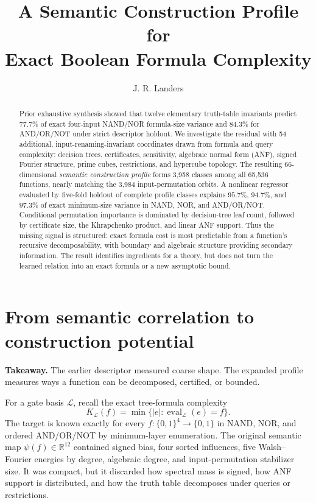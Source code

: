 \documentclass[10pt]{article}
\title{\vspace{-1.7em}\textbf{A Semantic Construction Profile for}\\[-1pt]
\textbf{Exact Boolean Formula Complexity}}
\author{J. R. Landers}
\date{\vspace{-1.4em}}
\theoremstyle{definition}
\begin{document}
\maketitle
\vspace{-1.6em}

\begin{abstract}
Prior exhaustive synthesis showed that twelve elementary truth-table invariants
predict $77.7\%$ of exact four-input NAND/NOR formula-size variance and $84.3\%$
for AND/OR/NOT under strict descriptor holdout.  We investigate the residual
with 54 additional, input-renaming-invariant coordinates drawn from formula
and query complexity: decision trees, certificates, sensitivity, algebraic
normal form (ANF), signed Fourier structure, prime cubes, restrictions, and
hypercube topology.  The resulting 66-dimensional \emph{semantic construction
profile} forms 3,958 classes among all 65,536 functions, nearly matching the
3,984 input-permutation orbits.  A nonlinear regressor evaluated by five-fold
holdout of complete profile classes explains $95.7\%$, $94.7\%$, and $97.3\%$
of exact minimum-size variance in NAND, NOR, and AND/OR/NOT.  Conditional
permutation importance is dominated by decision-tree leaf count, followed by
certificate size, the Khrapchenko product, and linear ANF support.  Thus the
missing signal is structured: exact formula cost is most predictable from a
function's recursive decomposability, with boundary and algebraic structure
providing secondary information.  The result identifies ingredients for a
theory, but does not turn the learned relation into an exact formula or a new
asymptotic bound.
\end{abstract}

\section{From semantic correlation to construction potential}

\textbf{Takeaway.} The earlier descriptor measured coarse shape.  The expanded
profile measures ways a function can be decomposed, certified, or bounded.

For a gate basis $\mathcal L$, recall the exact tree-formula complexity
\[
 K_{\mathcal L}(f)=\min\{|e|:\operatorname{eval}_{\mathcal L}(e)=f\}.
 \tag{1}
\]
The target is known exactly for every $f:\{0,1\}^4\to\{0,1\}$ in NAND, NOR,
and ordered AND/OR/NOT by minimum-layer enumeration.  The original semantic
map $\psi(f)\in\mathbb R^{12}$ contained signed bias, four sorted influences,
five Walsh--Fourier energies by degree, algebraic degree, and input-permutation
stabilizer size.  It was compact, but it discarded how spectral
mass is signed, how ANF support is distributed, and how the truth table
decomposes under queries or restrictions.
\end{document}
